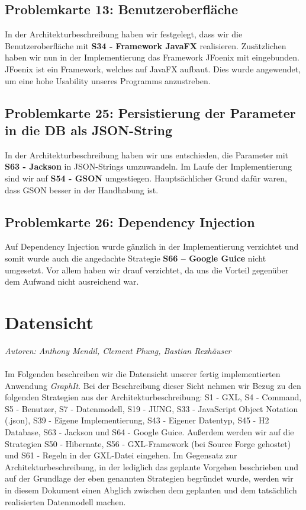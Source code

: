 \documentclass[enabledeprecatedfontcommands,fontsize=11pt,paper=a4,twoside]{scrartcl}
\begin{document}
\subsection{Problemkarte 13: Benutzeroberfläche}
In der Architekturbeschreibung haben wir festgelegt, dass wir die Benutzeroberfläche mit \textbf{S34 - Framework JavaFX} realisieren. Zusätzlichen haben wir nun in der Implementierung das Framework JFoenix mit eingebunden. JFoenix ist ein Framework, welches auf JavaFX aufbaut. Dies wurde angewendet, um eine hohe Usability unseres Programms anzustreben.\\


\subsection{Problemkarte 25: Persistierung der Parameter in die DB als JSON-String}
In der Architekturbeschreibung haben wir uns entschieden, die Parameter mit \textbf{S63 - Jackson} in JSON-Strings umzuwandeln. Im Laufe der Implementierung sind wir auf \textbf{S54 - GSON} umgestiegen. Hauptsächlicher Grund dafür waren, dass GSON besser in der Handhabung ist. \\


\subsection{Problemkarte 26: Dependency Injection}
Auf Dependency Injection wurde gänzlich in der Implementierung verzichtet und somit wurde auch die angedachte Strategie \textbf{S66 – Google Guice} nicht umgesetzt. Vor allem haben wir drauf verzichtet, da uns die Vorteil gegenüber dem Aufwand nicht ausreichend war. \\


\newpage
\section{Datensicht}
\label{sec:datensicht}

\emph{Autoren: Anthony Mendil, Clement Phung, Bastian Rexhäuser}\\ \\

Im Folgenden beschreiben wir die Datensicht unserer fertig implementierten Anwendung \textit{GraphIt}. Bei der Beschreibung dieser Sicht nehmen wir Bezug zu den folgenden Strategien aus der Architekturbeschreibung: S1 - GXL, S4 - Command, S5 - Benutzer, S7 - Datenmodell, S19 - JUNG, S33 - JavaScript Object Notation (.json), S39 - Eigene Implementierung, S43 - Eigener Datentyp, S45 - H2 Database, S63 - Jackson und S64 - Google Guice. Außerdem werden wir auf die Strategien S50 - Hibernate, S56 - GXL-Framework (bei Source Forge gehostet) und S61 - Regeln in der GXL-Datei eingehen. Im Gegensatz zur Architekturbeschreibung, in der lediglich das geplante Vorgehen beschrieben und auf der Grundlage der eben genannten Strategien begründet wurde, werden wir in diesem Dokument einen Abglich zwischen dem geplanten und dem tatsächlich realisierten Datenmodell machen. \\
\end{document}
